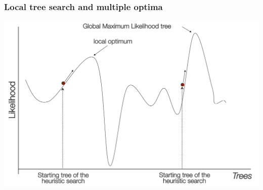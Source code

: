 \begin{frame}[plain]
\frametitle{Local tree search and multiple optima}

\includegraphics[width=\textwidth]{../images/localOptima}

\end{frame}

